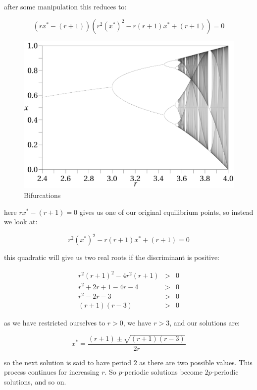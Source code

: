 \documentclass{report}
\begin{document}
after some manipulation this reduces to: \bigskip

\[
    (r x^* - (r + 1))(r^2 (x^*)^2 - r (r + 1) x^* + (r + 1)) = 0
\]\medskip

\begin{figure}[t]
	\centering
	\includegraphics[scale = 0.10]{logistic_bifurcation}
	\caption{Bifurcations}
	\label{fig:bifurcations}
\end{figure}\medskip

here $r x^* - (r + 1) = 0$ gives us one of our original equilibrium points, so instead we
look at: \bigskip

\[
    r^2 (x^*)^2 - r (r + 1) x^* + (r + 1) = 0
\]\medskip

this quadratic will give us two real roots if the discriminant is positive: \bigskip

\begin{eqnarray*}
     r^2 (r + 1)^2 - 4 r^2 (r + 1) & > & 0 \\
           r^2 + 2 r + 1 - 4 r - 4 & > & 0 \\
                     r^2 - 2 r - 3 & > & 0 \\
                   (r + 1) (r - 3) & > & 0
\end{eqnarray*}\medskip

as we have restricted ourselves to $r > 0$, we have $r > 3$, and our solutions are: \bigskip

\[
	x^* = \frac{(r + 1) \pm \sqrt{(r + 1) (r - 3)}}{2 r}
\]\medskip

so the next solution is said to have period $2$ as there are two possible values. This process
continues for increasing $r$. So $p$-periodic solutions become $2p$-periodic solutions, and so
on. \bigskip
\end{document}
